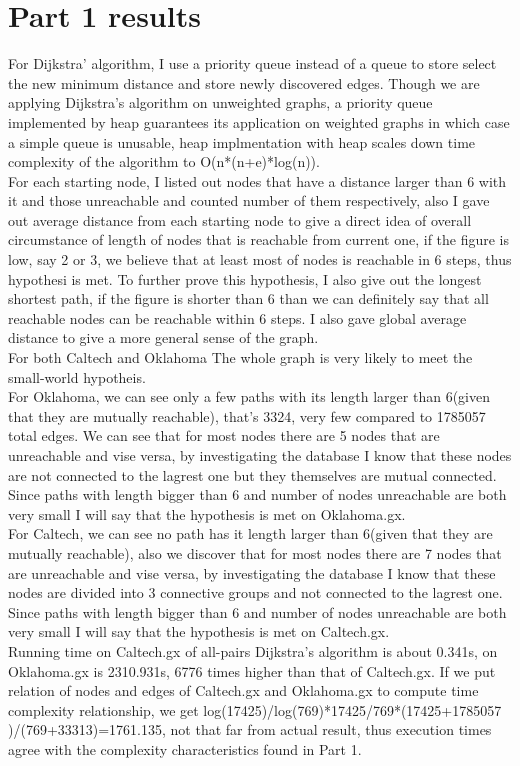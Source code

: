 \documentclass{article}
\begin{document}
\section{Part 1 results}
\label{sec:part1}
For Dijkstra' algorithm, I use a priority queue instead of a queue to store select the new minimum distance and store newly discovered edges. Though we are applying Dijkstra's algorithm on unweighted graphs, a priority queue implemented by heap guarantees its application on weighted graphs in which case a simple queue is unusable, heap implmentation with heap scales down time complexity of the algorithm to O(n*(n+e)*log(n)).\\
For each starting node, I listed out nodes that have a distance larger than 6 with it and those unreachable and counted number of them respectively, also I gave out average distance from each starting node to give a direct idea of overall circumstance of length of nodes that is reachable from current one, if the figure is low, say 2 or 3, we believe that at least most of nodes is reachable in 6 steps, thus hypothesi is met. To further prove this hypothesis, I also give out the longest shortest path, if the figure is shorter than 6 than we can definitely say that all reachable nodes can be reachable within 6 steps. I also gave global average distance to give a more general sense of the graph. \\
For both Caltech and Oklahoma The whole graph is very likely to meet the small-world hypotheis.\\
For Oklahoma, we can see only a few paths with its length larger than 6(given that they are mutually reachable), that's 3324, very few compared to 1785057 total edges. We can see that for most nodes there are 5 nodes that are unreachable and vise versa, by investigating the database I know that these nodes are not connected to the lagrest one but they themselves are mutual connected. Since paths with length bigger than 6 and number of nodes unreachable are both very small I will say that the hypothesis is met on Oklahoma.gx.\\
For Caltech, we can see no path has it length larger than 6(given that they are mutually reachable), also we discover that for most nodes there are 7 nodes that are unreachable and vise versa, by investigating the database I know that these nodes are divided into 3 connective groups and not connected to the lagrest one. Since paths with length bigger than 6 and number of nodes unreachable are both very small I will say that the hypothesis is met on Caltech.gx.\\
Running time on Caltech.gx of all-pairs Dijkstra's algorithm is about 0.341s, on Oklahoma.gx is 2310.931s, 6776 times higher than that of Caltech.gx. 
If we put relation of nodes and edges of Caltech.gx and Oklahoma.gx to compute time complexity relationship, we get log(17425)/log(769)*17425/769*(17425+1785057\\)/(769+33313)=1761.135, not that far from actual result, thus execution times agree with the complexity characteristics found in Part 1.
\end{document}
